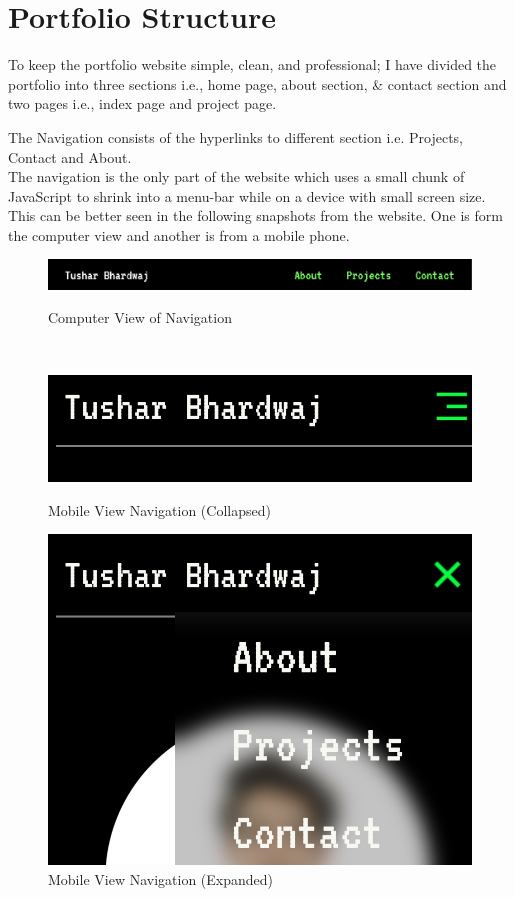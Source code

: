 \documentclass{report}
\begin{document}
\chapter{Portfolio Structure }
To keep the portfolio website simple, clean, and professional; I have divided the portfolio into three sections i.e., home page, about section, \& contact section and two pages i.e., index page and project page.\\
\par The Navigation consists of the hyperlinks to different section i.e. Projects, Contact and About. \\The navigation is the only part of the website which uses a small chunk of JavaScript to shrink into a menu-bar while on a device with small screen size.\\
This can be better seen in the following snapshots from the website. One is form the computer view and another is from a mobile phone.\\
\begin{figure}[h]
    \centering
    \includegraphics[width=0.5\linewidth]{webshots/nav-comp.png}
    \caption*{Computer View of Navigation}\\
    \lab
    \vspace{0.75cm}
    \begin{minipage}{0.49\textwidth}
        \centering
        \includegraphics[width=0.75\linewidth]{webshots/mob1.jpeg}
        \caption*{Mobile View Navigation (Collapsed)}
        \label*{}
    \end{minipage}
    \begin{minipage}{0.49\textwidth}
        \centering
        \includegraphics[width=0.75\linewidth]{webshots/mob2.jpeg}
        \caption*{Mobile View Navigation (Expanded)}
    \end{minipage}
\end{figure}\\
\end{document}
